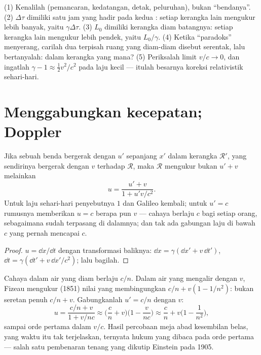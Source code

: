 \begin{method}\label{met:b3:relativistic-kinematics:method}
(1) Kenalilah \emph{} (pemancaran, kedatangan, detak,
peluruhan), bukan ``bendanya''. (2)  $\Delta\tau$ dimiliki
satu jam yang hadir pada kedua : setiap kerangka lain
mengukur lebih banyak, yaitu $\gamma\Delta\tau$. (3)  $L_0$
dimiliki kerangka diam batangnya: setiap kerangka lain mengukur lebih
pendek, yaitu $L_0/\gamma$. (4) Ketika ``paradoks'' menyerang, carilah
dua  terpisah ruang yang diam-diam disebut serentak, lalu
bertanyalah: dalam kerangka yang mana? (5) Periksalah limit
$v/c \to 0$, dan ingatlah $\gamma - 1 \approx \tfrac12 v^2/c^2$
pada laju kecil --- itulah besarnya koreksi relativistik sehari-hari.
\end{method}

\section{Menggabungkan kecepatan; Doppler}

\begin{proposition}\label{prop:b3:relativistic-kinematics:addition}
Jika sebuah benda bergerak dengan $u'$ sepanjang $x'$ dalam kerangka
$\mathcal R'$, yang sendirinya bergerak dengan $v$ terhadap
$\mathcal R$, maka $\mathcal R$ mengukur bukan $u' + v$ melainkan
\[
u = \frac{u' + v}{1 + u'v/c^2} .
\]
Untuk laju sehari-hari penyebutnya $1$ dan Galileo kembali; untuk
$u' = c$ rumusnya memberikan $u = c$ berapa pun $v$ --- cahaya berlaju
$c$ bagi setiap orang, sebagaimana sudah terpasang di dalamnya; dan tak
ada gabungan laju di bawah $c$ yang pernah mencapai $c$.
\end{proposition}

\begin{proof}
$u = \dd x/\dd t$ dengan transformasi baliknya: $\dd x =
\gamma(\dd x' + v\,\dd t')$, $\dd t = \gamma(\dd t' + v\,\dd x'/c^2)$;
lalu bagilah.
\end{proof}

\begin{example}\label{ex:b3:relativistic-kinematics:fizeau}
Cahaya dalam air yang diam berlaju $c/n$. Dalam air yang mengalir dengan
$v$, Fizeau mengukur (1851) nilai yang membingungkan
$c/n + v(1 - 1/n^2)$: bukan seretan penuh $c/n + v$. Gabungkanlah
$u' = c/n$ dengan $v$:
\[
u = \frac{c/n + v}{1 + v/nc}
\approx \Big(\frac{c}{n} + v\Big)\Big(1 - \frac{v}{nc}\Big)
\approx \frac{c}{n} + v\Big(1 - \frac{1}{n^2}\Big) ,
\]
sampai orde pertama dalam $v/c$. Hasil percobaan meja abad kesembilan
belas, yang waktu itu tak terjelaskan, ternyata hukum  yang dibaca pada orde pertama --- salah satu pembenaran
tenang yang dikutip Einstein pada 1905.
\end{example}

